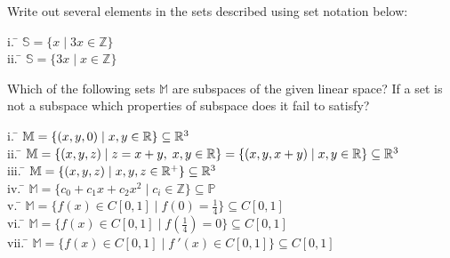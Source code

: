 \begin{myexb}[\bd{b}]
	Write out several elements in the sets described using set notation below:
		\begin{tabbing}
			\indent i. \quad  \= $\mathbb{S}=\{ x \; |\; 3x \in \mathbb{Z} \}$\\
			\indent ii. \> \= $\mathbb{S}=\{ 3x \; |\; x \in \mathbb{Z} \}$\\
		\end{tabbing}
\end{myexb}

\begin{myexc}[\bd{c}]
	Which of the following sets $\mathbb{M}$ are subspaces of the given linear space? If a set is not a subspace which properties of subspace does it fail to satisfy? 
	\begin{tabbing}
		\indent i. \quad  \= $\mathbb{M}=\{ ({x},{y},{0}) \; |\; x,y \in \mathbb{R} \}\subseteq \mathbb{R}^3$\\
		\indent ii.\> \= $\mathbb{M}=\{ ({x},{y},{z}) \;|\; z=x+y,\;x,y\in \mathbb{R}\}=\{({x},{y},{x+y})\;|\;  x,y \in \mathbb{R}\}\subseteq \mathbb{R}^3$\\
		\indent iii. \> \= $\mathbb{M}=\{ ({x},{y},{z}) \; |\; x,y,z \in \mathbb{R}^+ \}\subseteq \mathbb{R}^3$\\
		\indent iv. \> \= $\mathbb{M}=\{ c_0+c_1x+c_2x^2\; |\; c_i\in \mathbb{Z} \}\subseteq \mathbb{P}$\\
		\indent v. \> \= $\mathbb{M}=\{ f(x)\in C[0,1]\; |\; f(0) = \frac{1}{4} \}\subseteq C[0,1]$\\
		\indent vi. \> \= $\mathbb{M}=\{ f(x)\in C[0,1]\; |\; f(\frac{1}{4}) = 0 \}\subseteq C[0,1]$\\
		\indent vii. \> \= $\mathbb{M}=\{ f(x)\in C[0,1]\; |\; f\ '(x) \in C[0,1] \}\subseteq C[0,1]$\\
	\end{tabbing}
\end{myexc}

